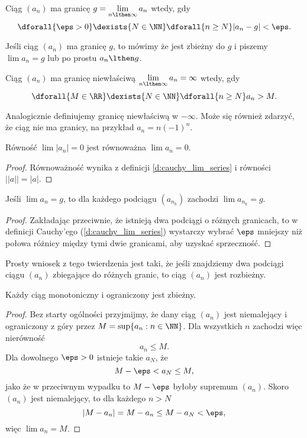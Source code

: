 \begin{definition}
    \label{d:cauchy_lim_series}
    Ciąg $(a_n)$ ma granicę $g = \displaystyle\lim_{n\lthen\infty} a_n$ wtedy, gdy
    \[ \dforall{\eps > 0} \dexists{N \in\NN} \dforall{n\geq N} |a_n - g| < \eps. \]
\end{definition}

Jeśli ciąg $(a_n)$ ma granicę $g$, to mówimy że jest zbieżny do $g$ i piszemy $\lim a_n = g$ lub po prostu $a_n \lthen g$.

\begin{definition}
    Ciąg $(a_n)$ ma granicę niewłaściwą $\displaystyle\lim_{n\lthen\infty} a_n = \infty$ wtedy, gdy
    \[ \dforall{M\in\RR} \dexists{N\in\NN} \dforall{n\geq N} a_n > M. \]
\end{definition}

Analogicznie definiujemy granicę niewłaściwą w $-\infty$. Może się również zdarzyć, że ciąg nie ma granicy, na przykład $a_n = n(-1)^n$.

\begin{fact}
    Równość $\lim |a_n| = 0$ jest równoważna $\lim a_n = 0$.
\end{fact}
\begin{proof}
    Równoważność wynika z definicji \ref{d:cauchy_lim_series} i równości $\left||a|\right| = |a|$.
\end{proof}

\begin{theorem}
    \label{t:lim_subsequence=lim_sequence}
    Jeśli $\lim a_n = g$, to dla każdego podciągu $(a_{n_k})$ zachodzi $\lim a_{n_k} = g$.
\end{theorem}
\begin{proof}
    Zakładając przeciwnie, że istnieją dwa podciągi o różnych granicach, to w definicji Cauchy'ego (\ref{d:cauchy_lim_series}) wystarczy wybrać $\eps$ mniejszy niż połowa różnicy między tymi dwie granicami, aby uzyskać sprzeczność.
\end{proof}

Prosty wniosek z tego twierdzenia jest taki, że jeśli znajdziemy dwa podciągi ciągu $(a_n)$ zbiegające do różnych granic, to ciąg $(a_n)$ jest rozbieżny.

\begin{theorem}
    \label{t:sequence monotonic and bounded}
    Każdy ciąg monotoniczny i ograniczony jest zbieżny.
\end{theorem}
\begin{proof}
    Bez starty ogólności przyjmijmy, że dany ciąg $(a_n)$ jest niemalejący i ograniczony z góry przez $M = \sup\{a_n : n \in \NN\}$. Dla wszystkich $n$ zachodzi więc nierówność
    \[ a_n \leq M. \]
    Dla dowolnego $\eps > 0$ istnieje takie $a_N$, że
    \[ M - \eps < a_N \leq M, \]
    jako że w przeciwnym wypadku to $M - \eps$ byłoby supremum $(a_n)$. Skoro $(a_n)$ jest niemalejący, to dla każdego $n > N$
    \[ |M - a_n| = M - a_n \leq M - a_N < \eps, \]
    więc $\lim a_n = M$.
\end{proof}

